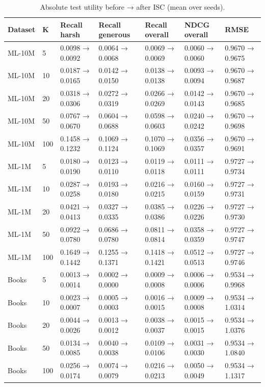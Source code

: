 \begin{table}[h]
\centering
\caption{Absolute test utility before → after ISC (mean over seeds).}
\small
\begin{tabular}{lllllll}
\toprule
Dataset & K & Recall harsh & Recall generous & Recall overall & NDCG overall & RMSE \\
\midrule
ML-10M & 5 & 0.0098 → 0.0092 & 0.0064 → 0.0068 & 0.0069 → 0.0069 & 0.0060 → 0.0060 & 0.9670 → 0.9675 \\
ML-10M & 10 & 0.0187 → 0.0165 & 0.0142 → 0.0150 & 0.0138 → 0.0138 & 0.0093 → 0.0094 & 0.9670 → 0.9687 \\
ML-10M & 20 & 0.0318 → 0.0306 & 0.0272 → 0.0319 & 0.0266 → 0.0269 & 0.0142 → 0.0143 & 0.9670 → 0.9685 \\
ML-10M & 50 & 0.0767 → 0.0670 & 0.0604 → 0.0688 & 0.0598 → 0.0603 & 0.0240 → 0.0242 & 0.9670 → 0.9698 \\
ML-10M & 100 & 0.1458 → 0.1232 & 0.1069 → 0.1124 & 0.1070 → 0.1069 & 0.0356 → 0.0357 & 0.9670 → 0.9691 \\
ML-1M & 5 & 0.0180 → 0.0190 & 0.0123 → 0.0110 & 0.0119 → 0.0118 & 0.0111 → 0.0111 & 0.9727 → 0.9734 \\
ML-1M & 10 & 0.0287 → 0.0258 & 0.0193 → 0.0180 & 0.0216 → 0.0215 & 0.0160 → 0.0159 & 0.9727 → 0.9731 \\
ML-1M & 20 & 0.0421 → 0.0413 & 0.0327 → 0.0335 & 0.0385 → 0.0386 & 0.0226 → 0.0226 & 0.9727 → 0.9730 \\
ML-1M & 50 & 0.0922 → 0.0780 & 0.0686 → 0.0780 & 0.0811 → 0.0814 & 0.0358 → 0.0359 & 0.9727 → 0.9747 \\
ML-1M & 100 & 0.1649 → 0.1442 & 0.1255 → 0.1371 & 0.1418 → 0.1421 & 0.0512 → 0.0513 & 0.9727 → 0.9746 \\
Books & 5 & 0.0013 → 0.0014 & 0.0002 → 0.0000 & 0.0009 → 0.0008 & 0.0006 → 0.0006 & 0.9534 → 0.9968 \\
Books & 10 & 0.0023 → 0.0007 & 0.0005 → 0.0003 & 0.0016 → 0.0015 & 0.0009 → 0.0008 & 0.9534 → 1.0314 \\
Books & 20 & 0.0044 → 0.0026 & 0.0013 → 0.0012 & 0.0038 → 0.0037 & 0.0015 → 0.0015 & 0.9534 → 1.0376 \\
Books & 50 & 0.0134 → 0.0085 & 0.0040 → 0.0038 & 0.0109 → 0.0106 & 0.0031 → 0.0030 & 0.9534 → 1.0840 \\
Books & 100 & 0.0256 → 0.0174 & 0.0074 → 0.0079 & 0.0216 → 0.0213 & 0.0050 → 0.0049 & 0.9534 → 1.1317 \\
\bottomrule
\end{tabular}
\end{table}
